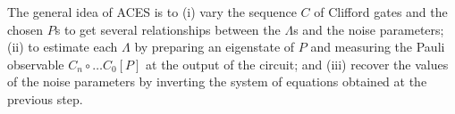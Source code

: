 The general idea of ACES is to (i) vary the sequence \(C\) of Clifford gates and the chosen \(P\)s to get several relationships between the \(\Lambda\)s and the noise parameters;
(ii) to estimate each \(\Lambda\) by preparing an eigenstate of \(P\) and measuring the Pauli observable \(C_n \circ \ldots C_0[P]\) at the output of the circuit;  and (iii) recover the values of the noise parameters by inverting the system of equations obtained at the previous step. 





